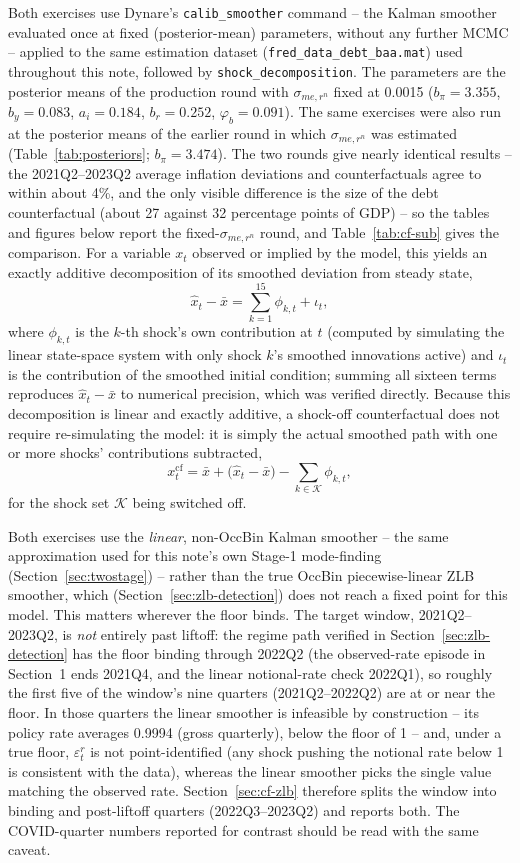 \documentclass[11pt]{article}
\begin{document}
Both exercises use Dynare's \texttt{calib\_smoother} command -- the Kalman
smoother evaluated once at fixed (posterior-mean) parameters, without any
further MCMC -- applied to the same estimation dataset
(\texttt{fred\_data\_debt\_baa.mat}) used throughout this note, followed by
\texttt{shock\_decomposition}. The parameters are the posterior means of the
production round with $\sigma_{me,r^n}$ fixed at 0.0015
($b_\pi=3.355$, $b_y=0.083$, $a_i=0.184$, $b_r=0.252$, $\varphi_b=0.091$).
The same exercises were also run at the posterior means of the earlier round
in which $\sigma_{me,r^n}$ was estimated (Table~\ref{tab:posteriors};
$b_\pi=3.474$). The two rounds give nearly identical results -- the
2021Q2--2023Q2 average inflation deviations and counterfactuals agree to
within about 4\%, and the only visible difference is
the size of the debt counterfactual (about 27 against 32 percentage points of
GDP) -- so the tables and figures below report the fixed-$\sigma_{me,r^n}$
round, and Table~\ref{tab:cf-sub} gives the comparison. For a variable $x_t$ observed or implied by
the model, this yields an exactly additive decomposition of its smoothed
deviation from steady state,
\[
\hat x_t - \bar x = \sum_{k=1}^{15} \phi_{k,t} + \iota_t,
\]
where $\phi_{k,t}$ is the $k$-th shock's own contribution at $t$ (computed
by simulating the linear state-space system with only shock $k$'s smoothed
innovations active) and $\iota_t$ is the contribution of the smoothed
initial condition; summing all sixteen terms reproduces $\hat x_t - \bar x$
to numerical precision, which was verified directly. Because this
decomposition is linear and exactly additive, a shock-off counterfactual
does not require re-simulating the model: it is simply the actual smoothed
path with one or more shocks' contributions subtracted,
\[
x_t^{\mathrm{cf}} = \bar x + \Big(\hat x_t - \bar x\Big) - \sum_{k \in \mathcal{K}} \phi_{k,t},
\]
for the shock set $\mathcal{K}$ being switched off.

Both exercises use the \emph{linear}, non-OccBin Kalman smoother -- the
same approximation used for this note's own Stage-1 mode-finding
(Section~\ref{sec:twostage}) -- rather than the true OccBin piecewise-linear
ZLB smoother, which (Section~\ref{sec:zlb-detection}) does not reach a
fixed point for this model. This matters wherever the floor binds. The
target window, 2021Q2--2023Q2, is \emph{not} entirely past liftoff: the
regime path verified in Section~\ref{sec:zlb-detection} has the floor
binding through 2022Q2 (the observed-rate episode in Section~1 ends
2021Q4, and the linear notional-rate check 2022Q1), so roughly the first
five of the window's nine quarters (2021Q2--2022Q2) are at or near the
floor. In those quarters the linear smoother is infeasible by
construction -- its policy rate averages 0.9994 (gross quarterly), below
the floor of 1 -- and, under a true floor, $\varepsilon^r_t$ is not
point-identified (any shock pushing the notional rate below 1 is
consistent with the data), whereas the linear smoother picks the single
value matching the observed rate. Section~\ref{sec:cf-zlb} therefore
splits the window into binding and post-liftoff quarters (2022Q3--2023Q2)
and reports both. The COVID-quarter numbers reported for contrast should
be read with the same caveat.
\end{document}
